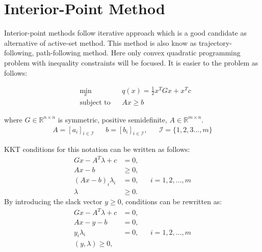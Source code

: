 \section{Interior-Point Method}
Interior-point methods follow iterative approach which is a good candidate as alternative of active-set method. This method is also know as trajectory-following, path-following method. 
Here only convex quadratic programming problem with inequality constraints will be focused. It is easier to the problem as follows:

\begin{equation}
\begin{aligned}
& \underset{x}{\text{min}}
& & q(x)= \frac{1}{2}x^{T}Gx+x^{T}c \\
& \text{subject to} & &  Ax \geqslant b
\end{aligned}
\label{eqn:Path_following_1}
\end{equation}

where $G\in \mathbb{R}^{n\times n}$ is symmetric, positive semidefinite, $A\in \mathbb{R}^{m\times n}$.
\begin{equation*}
	\begin{aligned}
		A = [a_i]_{i\in \mathcal{I}} & & b = [b_i]_{i\in \mathcal{I}}, & & \mathcal{I}=\lbrace 1,2,3...,m \rbrace 
	\end{aligned}
\end{equation*}

KKT conditions for this notation can be written as follows:
\begin{equation}
	\begin{aligned}
		Gx- A^T\lambda + c &= 0,\\
		Ax - b  &\geqslant 0, \\
		(Ax-b)_i\lambda_i &= 0, & & i = 1,2,...,m\\
		\lambda &\geqslant 0.
	\end{aligned}
	\label{eqn:Path_following_2}
\end{equation}
By introducing the slack vector $y \geqslant 0$, conditions can be rewritten as:
\begin{equation}
	\begin{aligned}
		Gx- A^T\lambda + c &= 0,\\
		Ax - y - b  &= 0, \\
		y_i\lambda_i &= 0, & & i=1,2,...,m\\
		(y,\lambda) \geqslant 0,
	\end{aligned}
	\label{eqn:Path_following_3}
\end{equation}

